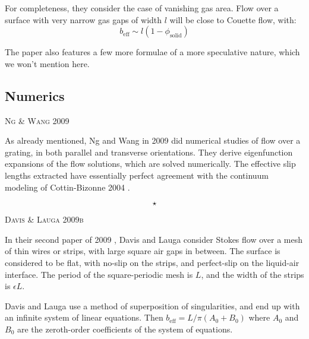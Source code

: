 \documentclass[a4paper]{report}
\newcommand{\beff}{\ensuremath{b_{\mathrm{eff}}}}
\newcommand{\phisol}{\ensuremath{\phi_{\mathrm{solid}}}}
\newcommand{\sep}{\begin{equation*} \star \end{equation*}}
\newcommand{\paper}[1]
         {\colorbox[gray]{0.8}{ \textsc{#1}}
         
         }
\begin{document}
\vspace{1em}
For completeness, they consider the case of vanishing gas area.  Flow over a surface with very narrow gas gaps of width $l$ will be close to Couette flow, with:
\begin{equation*}
\beff \sim l (1-\phisol) 
\end{equation*}

The paper also features a few more formulae of a more speculative nature, which we won't mention here.

\subsection*{Numerics}

\paper{Ng \& Wang 2009}
As already mentioned, Ng and Wang in 2009 \cite{NgWang2009} did numerical studies of flow over a grating, in both parallel and transverse orientations. They derive eigenfunction expansions of the flow solutions, which are solved numerically.  The effective slip lengths extracted have essentially perfect agreement with the continuum modeling of Cottin-Bizonne 2004 \cite{Cottin-Bizonne2004}.

\sep

\paper{Davis \& Lauga 2009b}
In their second paper of 2009 \cite{DavisLauga2009b}, Davis and Lauga consider Stokes flow over a mesh of thin wires or strips, with large square air gaps in between.  The surface is considered to be flat, with no-slip on the strips, and perfect-slip on the liquid-air interface.  The period of the square-periodic mesh is $L$, and the width of the strips is $\epsilon L$.

\begin{center}
\end{center}

Davis and Lauga use a method of superposition of singularities, and end up with an infinite system of linear equations.  Then $\beff = L/\pi (A_0 + B_0)$ where $A_0$ and $B_0$ are the zeroth-order coefficients of the system of equations.
\end{document}
